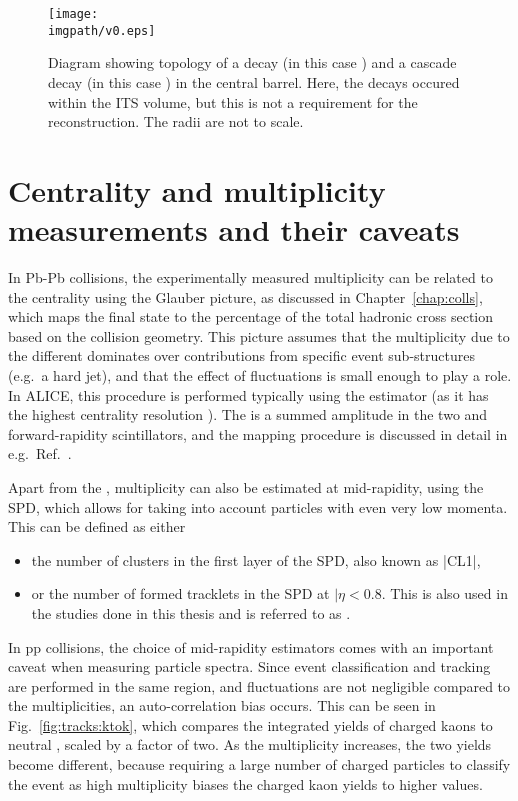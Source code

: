 
\begin{figure}%
\texttt{[image: \\imgpath/v0.eps]}\\
\caption{Diagram showing topology of a \VO decay (in this case \KOs) and a cascade decay (in this case \XI) in the central barrel. Here, the decays occured within the ITS volume, but this is not a requirement for the reconstruction. The radii are not to scale. \cite{alicecollaborationPerformanceALICEExperiment2014}}
\label{fig:tracks:topo}
\end{figure}

\section{Centrality and multiplicity measurements and their caveats}

In Pb-Pb collisions, the experimentally measured multiplicity can be related to the centrality using the Glauber picture, as discussed in Chapter~\ref{chap:colls}, which maps the final state to the percentage of the total hadronic cross section based on the collision geometry. This picture assumes that the multiplicity due to the different \Npart dominates over contributions from specific event sub-structures (e.g.\ a hard jet), and that the effect of fluctuations is small enough to play a role. In ALICE, this procedure is performed typically using the \VOM estimator (as it has the highest centrality resolution \cite{alicecollaborationPerformanceALICEExperiment2014}). The \VOM is a summed amplitude in the two \VOA and \VOC forward-rapidity scintillators, and the mapping procedure is discussed in detail in e.g.\ Ref.~\cite{alicecollaborationCentralityDeterminationPbPb2013}.

Apart from the \VOM, multiplicity can also be estimated at mid-rapidity, using the SPD, which allows for taking into account particles with even very low momenta. This can be defined as either
\begin{itemize}
\item the number of clusters in the first layer of the SPD, also known as \spverb|CL1|,
\item or the number of formed tracklets in the SPD at $|\eta < 0.8$. This is also used in the studies done in this thesis and is referred to as \NSPD.
\end{itemize}

In pp collisions, the choice of mid-rapidity estimators comes with an important caveat when measuring particle spectra. Since event classification and tracking are performed in the same region, and fluctuations are not negligible compared to the multiplicities, an auto-correlation bias occurs. This can be seen in Fig.~\ref{fig:tracks:ktok}, which compares the integrated yields of charged kaons to neutral \KOs, scaled by a factor of two. As the multiplicity increases, the two yields become different, because requiring a large number of charged particles to classify the event as high multiplicity biases the charged kaon yields to higher values.

